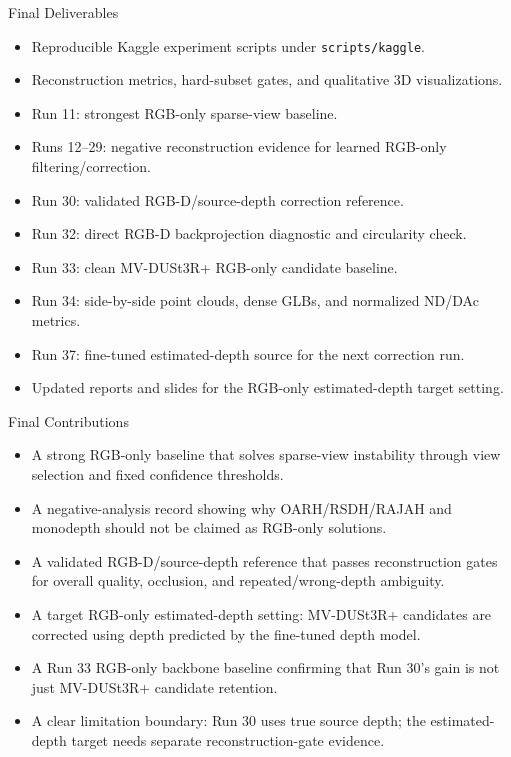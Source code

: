 \begin{frame}{Final Deliverables}
  \scriptsize
  \begin{itemize}
    \item Reproducible Kaggle experiment scripts under \texttt{scripts/kaggle}.
    \item Reconstruction metrics, hard-subset gates, and qualitative 3D
    visualizations.
    \item Run 11: strongest RGB-only sparse-view baseline.
    \item Runs 12--29: negative reconstruction evidence for learned
    RGB-only filtering/correction.
    \item Run 30: validated RGB-D/source-depth correction reference.
    \item Run 32: direct RGB-D backprojection diagnostic and circularity check.
    \item Run 33: clean MV-DUSt3R+ RGB-only candidate baseline.
    \item Run 34: side-by-side point clouds, dense GLBs, and normalized
    ND/DAc metrics.
    \item Run 37: fine-tuned estimated-depth source for the next correction run.
    \item Updated reports and slides for the RGB-only estimated-depth target
    setting.
  \end{itemize}
\end{frame}

\begin{frame}{Final Contributions}
  \footnotesize
  \begin{itemize}
    \item A strong RGB-only baseline that solves sparse-view instability through
    view selection and fixed confidence thresholds.
    \item A negative-analysis record showing why OARH/RSDH/RAJAH and monodepth
    should not be claimed as RGB-only solutions.
    \item A validated RGB-D/source-depth reference that passes reconstruction
    gates for overall quality, occlusion, and repeated/wrong-depth ambiguity.
    \item A target RGB-only estimated-depth setting: MV-DUSt3R+ candidates are
    corrected using depth predicted by the fine-tuned depth model.
    \item A Run 33 RGB-only backbone baseline confirming that Run 30's gain is
    not just MV-DUSt3R+ candidate retention.
    \item A clear limitation boundary: Run 30 uses true source depth; the
    estimated-depth target needs separate reconstruction-gate evidence.
  \end{itemize}
\end{frame}
